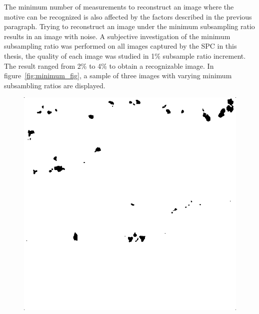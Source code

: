 The minimum number of measurements to reconstruct an image where the motive can be recognized is also affected by the factors described in the previous paragraph. Trying to reconstruct an image under the minimum subsampling ratio results in an image with noise. A subjective investigation of the minimum subsampling ratio was performed on all images captured by the SPC in this thesis, the quality of each image was studied in 1\% subsample ratio increment. The result ranged from 2\% to 4\% to obtain a recognizable image. In figure~\ref{fig:minimum_fig}, a sample of three images with varying minimum subsambling ratios are displayed.


\begin{figure}[H]
\begin{minipage}[t]{0.32\linewidth} %
	\includegraphics[width = 1\linewidth]{result/minimum/24_512_m2.PNG}
	\label{fig:minimum_car}
\end{minipage}
\begin{minipage}[t]{0.32\linewidth} %

\end{minipage}
\end{figure}
